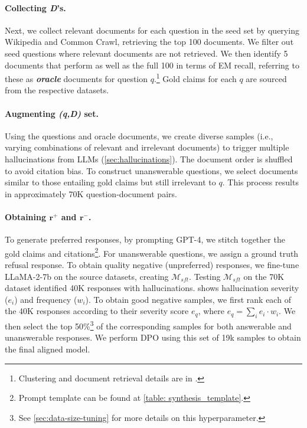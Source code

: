 \documentclass{article} %
\begin{document}
\paragraph{Collecting \textit{D}'s.}
Next, we collect relevant documents for each question in the seed set by querying Wikipedia and Common Crawl, retrieving the top 100 documents. We filter out seed questions where relevant documents are not retrieved. We then identify 5 documents that perform as well as the full 100 in terms of EM recall, referring to these as \textbf{\textit{oracle}} documents for question \(q\).\footnote{Clustering and document retrieval details are in .} Gold claims for each $q$ are sourced from the respective datasets.

\paragraph{Augmenting \textbf{\textit{(q,D)}} set.}
Using the questions and oracle documents, we create diverse samples (i.e., varying combinations of relevant and irrelevant documents) to trigger multiple hallucinations from LLMs (\cref{sec:hallucinations}). The document order is shuffled to avoid citation bias. To construct unanswerable questions, we select documents similar to those entailing gold claims but still irrelevant to \(q\). This process results in approximately 70K question-document pairs.

\paragraph{Obtaining {$\mathbf{r^+}$} and {$\mathbf{r^-}$}.}
To generate preferred responses, by prompting GPT-4, we stitch together the gold claims and citations\footnote{Prompt template can be found at \cref{table: synthesis_template}.}. For unanswerable questions, we assign a ground truth refusal response. To obtain quality negative (unpreferred) responses, we fine-tune LLaMA-2-7b on the source datasets, creating \(\mathcal{M}_{sft}\). Testing \(\mathcal{M}_{sft}\) on the 70K dataset identified 40K responses with hallucinations.  shows hallucination severity ($e_i$) and frequency ($w_i$). To obtain good negative samples, we first rank each of the 40K responses according to their severity score \(e_q\), where \(e_q = \sum_i e_i \cdot w_i\). We then select the top 50\%\footnote{See \cref{sec:data-size-tuning} for more details on this hyperparameter.} of the corresponding samples for both answerable and unanswerable responses. We perform DPO using this set of 19k samples to obtain the final aligned model. 
\end{document}
